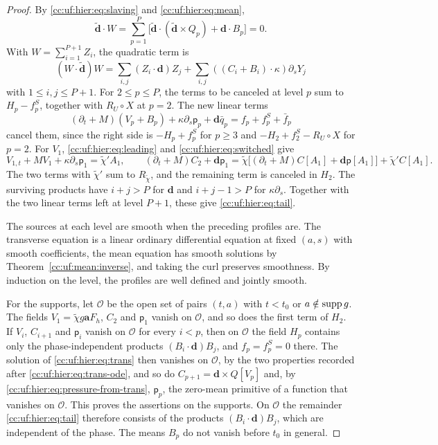 \begin{proof}
By \eqref{cc:uf:hier:eq:slaving} and \eqref{cc:uf:hier:eq:mean},
\[
 \widetilde{\mathbf d}\cdot W
 =\sum_{p=1}^P\bigl[\widetilde{\mathbf d}\cdot
   (\widetilde{\mathbf d}\times Q_p)+\mathbf d\cdot B_p\bigr]=0.
\]
With $W=\sum_{i=1}^{P+1}Z_i$, the quadratic term is
\[
 (W\cdot\widetilde{\mathbf d})W
 =\sum_{i,j}(Z_i\cdot\mathbf d)Z_j
  +\sum_{i,j}((C_i+B_i)\cdot\kappa)\partial_sY_j
\]
with $1\le i,j\le P+1$. For $2\le p\le P$, the terms to be
canceled at level $p$ sum to $H_p-f_p^S$, together with $R_U\circ X$
at $p=2$. The new linear terms
\[
 (\partial_t+M)(V_p+B_p)+\kappa\partial_s\mathsf p_p
    +\mathbf d\bar q_p=f_p+f_p^S+\bar f_p
\]
cancel them, since the right side is $-H_p+f_p^S$ for $p\ge3$ and
$-H_2+f_2^S-R_U\circ X$ for $p=2$. For $V_1$, \eqref{cc:uf:hier:eq:leading}
and \eqref{cc:uf:hier:eq:switched} give
\[
 V_{1,t}+MV_1+\kappa\partial_s\mathsf p_1=\widetilde\chi'A_1,\qquad
 (\partial_t+M)C_2+\mathbf d\mathsf p_1
 =\widetilde\chi\bigl[(\partial_t+M)C[A_1]+\mathbf d\mathsf p[A_1]\bigr]
  +\widetilde\chi'C[A_1].
\]
The two terms with $\widetilde\chi'$ sum to $R_{\widetilde\chi}$, and the
remaining term is canceled in $H_2$. The surviving
products have $i+j>P$ for $\mathbf d$ and $i+j-1>P$ for
$\kappa\partial_s$. Together with the two linear terms left at
level $P+1$, these give \eqref{cc:uf:hier:eq:tail}.

The sources at each level are smooth when the preceding profiles are.
The transverse equation is a linear ordinary differential equation at
fixed $(a,s)$ with smooth coefficients, the mean equation has smooth
solutions by Theorem~\ref{cc:uf:mean:inverse}, and taking the curl
preserves smoothness. By induction on the level, the profiles are well
defined and jointly smooth.

For the supports, let $\mathcal O$ be the open set of pairs $(t,a)$ with
$t<t_0$ or $a\notin\operatorname{supp} g$. The fields
$V_1=\widetilde\chi g\mathbf a F_h$, $C_2$ and $\mathsf p_1$ vanish on
$\mathcal O$, and so does the first term of $H_2$. If $V_i$,
$C_{i+1}$ and $\mathsf p_i$ vanish on $\mathcal O$ for every $i<p$, then
on $\mathcal O$ the field $H_p$ contains only the phase-independent
products $(B_i\cdot\mathbf d)B_j$, and $f_p=f_p^S=0$ there. The solution
of \eqref{cc:uf:hier:eq:trans} then vanishes on $\mathcal O$, by the two
properties recorded after \eqref{cc:uf:hier:eq:trans-ode}, and so do
$C_{p+1}=\mathbf d\times Q[V_p]$ and, by
\eqref{cc:uf:hier:eq:pressure-from-trans}, $\mathsf p_p$, the zero-mean
primitive of a function that vanishes on $\mathcal O$. This proves the
assertions on the supports. On $\mathcal O$ the remainder \eqref{cc:uf:hier:eq:tail}
therefore consists of the products $(B_i\cdot\mathbf d)B_j$, which are
independent of the phase. The means $B_p$ do not vanish before $t_0$
in general.
\end{proof}

